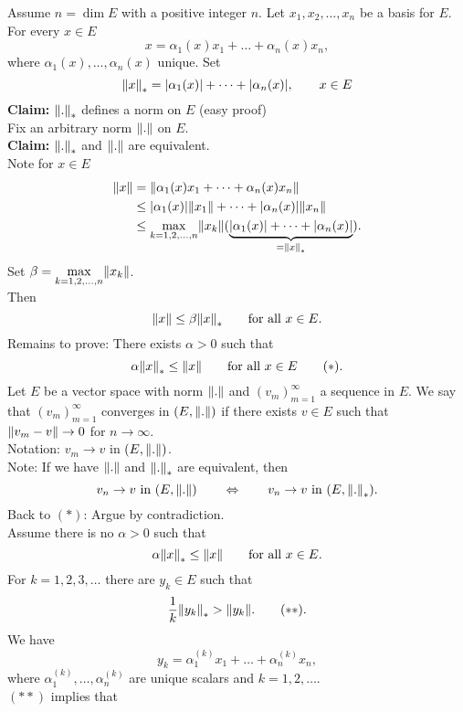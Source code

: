 \begin{beweis}
	Assume $n = \dim E$ with a positive integer $n$. Let $x_1,x_2, \dots , x_n$ be a basis for $E$. For every $x \in E$
	\[
		x = \alpha_1(x)x_1 + \dots + \alpha_n(x)x_n,
	\]
	where $\alpha_1(x), \dots, \alpha_n(x)$ unique. Set 
	\[
		\norm{x}_{*} = \abs{\alpha_1(x)}+ \dots + \abs{\alpha_n(x)}, \qquad x \in E
	\]
	\textbf{Claim:} \text{    }     $\norm{.}_{*}$ defines a norm on $E$ (easy proof) \\
	Fix an arbitrary norm $\norm{.}$ on $E$. \\
	\textbf{Claim:} \text{    }     $\norm{.}_{*}$ and $\norm{.}$ are equivalent. \\
	Note for $x \in E$
	\begin{align*}
		\norm{x} &= \norm{\alpha_1(x)x_1 + \dots + \alpha_n(x)x_n}  \\
		&\leq \abs{\alpha_1(x)}\norm{x_1} + \dots + \abs{\alpha_n(x)} \norm{x_n} \\
		&\leq \max\limits_{k=1,2,\dots,n} \norm{x_k} ( \underset{= \norm{x}_{*}}{\underbrace{\abs{\alpha_1(x)}+ \dots + \abs{\alpha_n(x)}}}).
	\end{align*}
	Set $\beta = \max\limits_{k=1,2,\dots,n} \norm{x_k}$. \\
	Then
	\[
		\norm{x} \leq \beta \norm{x}_{*} \qquad \text{for all }x \in E.
	\]
	Remains to prove: There exists $\alpha >0$ such that
	\[
		\alpha \norm{x}_{*} \leq \norm{x} \qquad \text{for all } x \in E \qquad (*).
	\]
	Let $E$ be a vector space with norm $\norm{.}$ and $(v_m)_{m=1}^{\infty}$ a sequence in $E$. We say that $(v_m)_{m=1}^{\infty}$ converges in $(E,\norm{.})$ if there exists $v \in E$ such that $\norm{v_m-v} \to 0$ for $n \to \infty$. \\
	Notation: $v_m \to v$ in $(E, \norm{.})$. \\
	Note: If we have $\norm{.}$ and $\norm{.}_{*}$ are equivalent, then
	\[
		v_n \to v \text{ in }(E,\norm{.}) \qquad  \Leftrightarrow \qquad v_n \to v \text{ in }(E,\norm{.}_{*}).
	\] 
	Back to $(*)$: Argue by contradiction. \\
	Assume there is no $\alpha >0$ such that
	\[
		\alpha \norm{x}_{*} \leq \norm{x} \qquad \text{for all } x \in E.
	\]
	For $k=1,2,3,\dots$ there are $y_k \in E$ such that
	\[
		\frac{1}{k}\norm{y_k}_{*} > \norm{y_k}. \qquad (**).
	\]
	We have 
	\[
		y_k = \alpha_1^{(k)} x_1 + \dots + \alpha_n^{(k)} x_n,
	\]
	where $\alpha_1^{(k)}, \dots, \alpha_n^{(k)}$ are unique scalars and $k = 1,2, \dots$. \\
	$(**)$ implies that
	\[
\]
\end{beweis}

